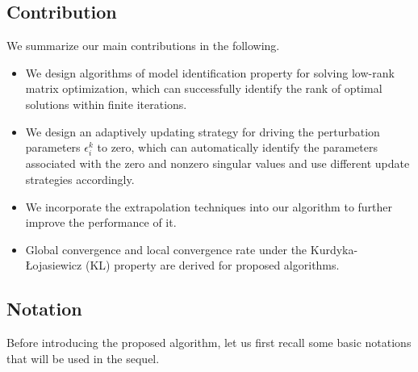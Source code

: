 \documentclass[twoside,11pt]{article}
\numberwithin{equation}{section}
\begin{document}
\subsection{Contribution}
We summarize our main contributions in the following.  
\begin{itemize}
  \item  We design algorithms of model identification property  for solving  low-rank matrix optimization, which can successfully identify the 
  rank of optimal solutions within finite iterations.
  \item We design an adaptively updating strategy for driving the perturbation  parameters $\epsilon_{i}^{k}$ to zero, which can automatically identify the parameters associated with the zero and nonzero singular values and use different update strategies accordingly.
  \item We incorporate  the extrapolation techniques  into our algorithm to further improve the performance of it. 
  \item Global convergence and local convergence rate  under the Kurdyka-{\L}ojasiewicz (KL) property are derived for proposed algorithms. 
 
\end{itemize} 




\subsection{Notation}
Before introducing the proposed algorithm, let us first recall some basic notations that will be used in the sequel.
\end{document}
